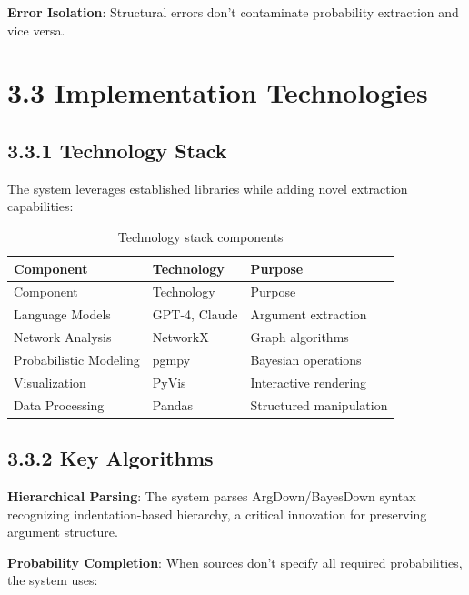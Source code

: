 \documentclass[
  11pt,
  letterpaper,
]{book}
\begin{document}
\textbf{Error Isolation}: Structural errors don't contaminate
probability extraction and vice versa.

\section*{3.3 Implementation
Technologies}\label{sec-implementation-tech}


\subsection*{3.3.1 Technology Stack}\label{sec-tech-stack}

The system leverages established libraries while adding novel extraction
capabilities:

\begin{longtable}[]{@{}lll@{}}
\caption{Technology stack
components}\label{tbl-tech-stack}\tabularnewline
\toprule\noalign{}
Component & Technology & Purpose \\
\midrule\noalign{}
\endfirsthead
\toprule\noalign{}
Component & Technology & Purpose \\
\midrule\noalign{}
\endhead
\bottomrule\noalign{}
\endlastfoot
Language Models & GPT-4, Claude & Argument extraction \\
Network Analysis & NetworkX & Graph algorithms \\
Probabilistic Modeling & pgmpy & Bayesian operations \\
Visualization & PyVis & Interactive rendering \\
Data Processing & Pandas & Structured manipulation \\
\end{longtable}

\subsection*{3.3.2 Key Algorithms}\label{sec-key-algorithms}

\textbf{Hierarchical Parsing}: The system parses ArgDown/BayesDown
syntax recognizing indentation-based hierarchy, a critical innovation
for preserving argument structure.

\textbf{Probability Completion}: When sources don't specify all required
probabilities, the system uses:
\end{document}
